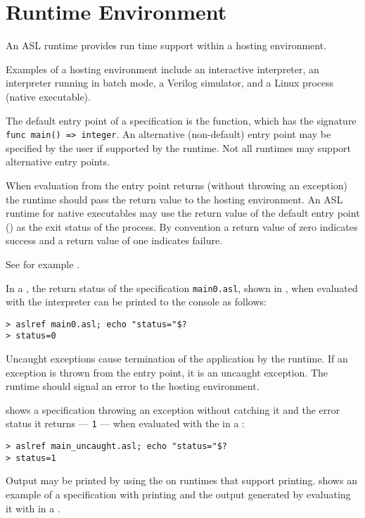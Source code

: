\chapter{Runtime Environment\label{chap:RuntimeEnvironment}}

An ASL runtime provides run time support within a hosting environment.

Examples of a hosting environment include an interactive interpreter,
an interpreter running in batch mode,
a Verilog simulator, and a Linux process (native executable).

The default entry point of a specification is the \vmain{} function, which has the signature
\verb|func main() => integer|.
An alternative (non-default) entry point may be specified by the user if
supported by the runtime. Not all runtimes may support alternative entry points.

When evaluation from the entry point returns (without
throwing an exception)
the runtime should pass the return value to the hosting environment.
%
An ASL runtime for native executables may use the return value
of the default entry point (\vmain{}) as the exit status of the process.
%
By convention a return value of zero indicates success and a return value of
one indicates failure.
%

See for example .

In a \linuxbashshellterm{}, the return status of the specification \texttt{main0.asl},
shown in ,
when evaluated with the \aslrefterm{}
interpreter can be printed to the console as follows:
\begin{Verbatim}[frame=single]
> aslref main0.asl; echo "status="$?
> status=0
\end{Verbatim}


Uncaught exceptions cause termination of the application by the runtime.
If an exception is thrown from the entry point, it is an uncaught exception.
The runtime should signal an error to the hosting environment.

 shows a specification throwing an exception
without catching it and the error status it returns --- \texttt{1} ---
when evaluated with the \aslrefterm{} in a \linuxbashshellterm{}:
\begin{verbatim}
> aslref main_uncaught.asl; echo "status="$?
> status=1
\end{verbatim}


Output may be printed by using the \printstatementterm{} on
runtimes that support printing.
%
 shows an example of a specification
with printing and the output generated by evaluating it with \aslrefterm{}
in a \linuxbashshellterm{}.
